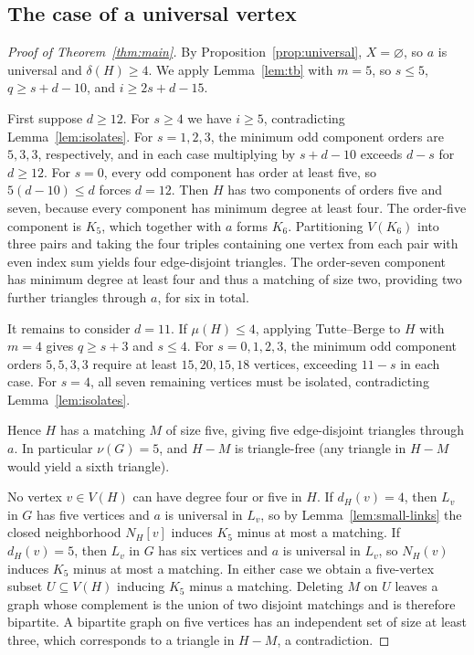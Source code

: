 \documentclass[11pt]{article}
\begin{document}
\subsection{The case of a universal vertex}

\begin{proof}[Proof of Theorem~\ref{thm:main}]
By Proposition~\ref{prop:universal}, $X=\varnothing$, so $a$ is universal and $\delta(H)\geq 4$. We apply Lemma~\ref{lem:tb} with $m=5$, so $s\leq 5$, $q\geq s+d-10$, and $i\geq 2s+d-15$.

First suppose $d\geq 12$. For $s\geq 4$ we have $i\geq 5$, contradicting Lemma~\ref{lem:isolates}. For $s=1,2,3$, the minimum odd component orders are $5,3,3$, respectively, and in each case multiplying by $s+d-10$ exceeds $d-s$ for $d\geq 12$. For $s=0$, every odd component has order at least five, so $5(d-10)\leq d$ forces $d=12$. Then $H$ has two components of orders five and seven, because every component has minimum degree at least four. The order-five component is $K_5$, which together with $a$ forms $K_6$. Partitioning $V(K_6)$ into three pairs and taking the four triples containing one vertex from each pair with even index sum yields four edge-disjoint triangles. The order-seven component has minimum degree at least four and thus a matching of size two, providing two further triangles through $a$, for six in total.

It remains to consider $d=11$. If $\mu(H)\leq 4$, applying Tutte--Berge to $H$ with $m=4$ gives $q\geq s+3$ and $s\leq 4$. For $s=0,1,2,3$, the minimum odd component orders $5,5,3,3$ require at least $15,20,15,18$ vertices, exceeding $11-s$ in each case. For $s=4$, all seven remaining vertices must be isolated, contradicting Lemma~\ref{lem:isolates}.

Hence $H$ has a matching $M$ of size five, giving five edge-disjoint triangles through $a$. In particular $\nu(G)=5$, and $H-M$ is triangle-free (any triangle in $H-M$ would yield a sixth triangle).

No vertex $v\in V(H)$ can have degree four or five in $H$. If $d_H(v)=4$, then $L_v$ in $G$ has five vertices and $a$ is universal in $L_v$, so by Lemma~\ref{lem:small-links} the closed neighborhood $N_H[v]$ induces $K_5$ minus at most a matching. If $d_H(v)=5$, then $L_v$ in $G$ has six vertices and $a$ is universal in $L_v$, so $N_H(v)$ induces $K_5$ minus at most a matching. In either case we obtain a five-vertex subset $U\subseteq V(H)$ inducing $K_5$ minus a matching. Deleting $M$ on $U$ leaves a graph whose complement is the union of two disjoint matchings and is therefore bipartite. A bipartite graph on five vertices has an independent set of size at least three, which corresponds to a triangle in $H-M$, a contradiction.


\end{proof}
\end{document}
